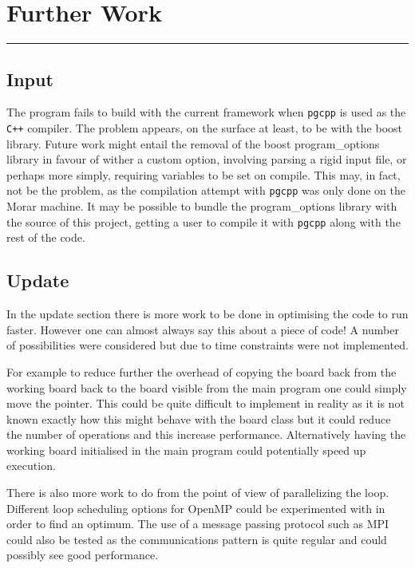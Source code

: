 \section{Further Work}
\vspace{-2em}\rule{\textwidth}{1pt}\vspace{-1em}
\subsection{Input}
  The program fails to build with the current framework when \texttt{pgcpp}
  is used as the \texttt{C++} compiler.
  The problem appears, on the surface at least, to be with the boost library.
  Future work might entail the removal of the boost program\_options library
  in favour of wither a custom option, involving parsing a rigid input file,
  or perhaps more simply, requiring variables to be set on compile.
  This may, in fact, not be the problem, as the compilation attempt with
  \texttt{pgcpp} was only done on the Morar machine.
  It may be possible to bundle the program\_options library with the
  source of this project, getting a user to compile it with \texttt{pgcpp}
  along with the rest of the code.
\subsection{Update}
  In the update section there is more work to be done in optimising the code to run faster.
  However one can almost always say this about a piece of code!
  A number of possibilities were considered but due to time constraints were not implemented.

  For example to reduce further the overhead of copying the board back from the working board back to the board visible from the main program one could simply move the pointer.
  This could be quite difficult to implement in reality as it is not known exactly how this might behave with the board class but it could reduce the number of operations and this increase performance.
  Alternatively having the working board initialised in the main program could potentially speed up execution.

  There is also more work to do from the point of view of parallelizing the loop.
  Different loop scheduling options for OpenMP could be experimented with in order to find an optimum.
  The use of a message passing protocol such as MPI could also be tested as the communications pattern is quite regular and could possibly see good performance.


